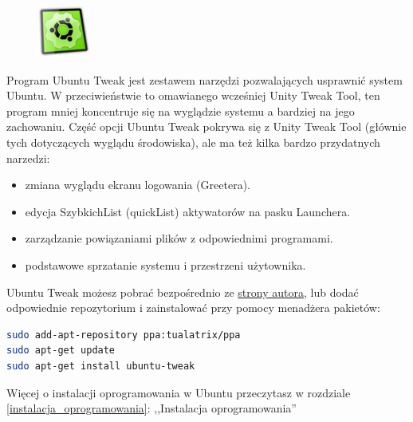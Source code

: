 \begin{figure}
	\vspace{-10pt}
	\includegraphics[width=\linewidth]{images/ikony_ubuntutweak.png}
\end{figure}

Program \textcolor{ubuntu_orange}{Ubuntu Tweak} jest zestawem narzędzi pozwalających usprawnić system Ubuntu. W przeciwieństwie to omawianego wcześniej Unity Tweak Tool, ten program mniej koncentruje się na wyglądzie systemu a bardziej na jego zachowaniu. Część opcji Ubuntu Tweak pokrywa się z Unity Tweak Tool (głównie tych dotyczących wyglądu środowiska), ale ma też kilka bardzo przydatnych narzedzi:

\begin{itemize}
\item {} zmiana wyglądu ekranu logowania (Greetera).
\item {} edycja SzybkichList (quickList) aktywatorów na pasku Launchera.
\item {} zarządzanie powiązaniami plików z odpowiednimi programami.
\item {} podstawowe sprzatanie systemu i przestrzeni użytownika.
\end{itemize}

Ubuntu Tweak możesz pobrać bezpośrednio ze \href{http://ubuntu-tweak.com/}{strony autora}, lub dodać odpowiednie repozytorium i zainstalować przy pomocy menadżera pakietów:
\begin{lstlisting}[language=bash]
sudo add-apt-repository ppa:tualatrix/ppa
sudo apt-get update
sudo apt-get install ubuntu-tweak
\end{lstlisting}

Więcej o instalacji oprogramowania w Ubuntu przeczytasz w rozdziale \ref{instalacja_oprogramowania}: ,,Instalacja oprogramowania''